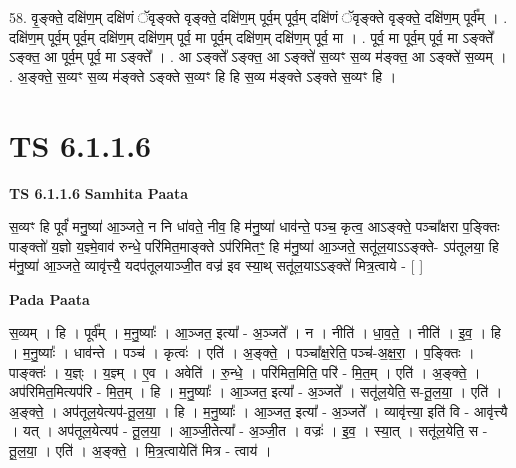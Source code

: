\documentclass[17pt]{extarticle}
\begin{document}
58. वृ॒ङ्क्ते॒ दक्षि॑ण॒म् दक्षि॑णं ॅवृङ्क्ते वृङ्क्ते॒ दक्षि॑ण॒म् पूर्व॒म् पूर्व॒म् दक्षि॑णं ॅवृङ्क्ते वृङ्क्ते॒ दक्षि॑ण॒म् पूर्व᳚म् । . दक्षि॑ण॒म् पूर्व॒म् पूर्व॒म् दक्षि॑ण॒म् दक्षि॑ण॒म् पूर्व॒ मा पूर्व॒म् दक्षि॑ण॒म् दक्षि॑ण॒म् पूर्व॒ मा । . पूर्व॒ मा पूर्व॒म् पूर्व॒ मा ऽङ्क्ते᳚ ऽङ्क्त॒ आ पूर्व॒म् पूर्व॒ मा ऽङ्क्ते᳚ । . आ ऽङ्क्ते᳚ ऽङ्क्त॒ आ ऽङ्क्ते॑ स॒व्यꣳ स॒व्य म॑ङ्क्त॒ आ ऽङ्क्ते॑ स॒व्यम् । . अ॒ङ्क्ते॒ स॒व्यꣳ स॒व्य म॑ङ्क्ते ऽङ्क्ते स॒व्यꣳ हि हि स॒व्य म॑ङ्क्ते ऽङ्क्ते स॒व्यꣳ हि । \newline
\pagebreak
{}

\section{ TS 6.1.1.6 }

\textbf{TS 6.1.1.6 } \newline
\textbf{Samhita Paata} \newline

स॒व्यꣳ हि पूर्वं॑ मनु॒ष्या॑ आ॒ञ्जते॒ न नि धा॑वते॒ नीव॒ हि म॑नु॒ष्या॑ धाव॑न्ते॒ पञ्च॒ कृत्व॒ आऽङ्क्ते॒ पञ्चा᳚क्षरा प॒ङ्क्तिः पाङ्क्तो॑ य॒ज्ञो य॒ज्ञ्मे॒वाव॑ रुन्धे॒ परि॑मित॒माङ्क्ते ऽप॑रिमितꣳ॒॒ हि म॑नु॒ष्या॑ आ॒ञ्जते॒ सतू॑ल॒याऽऽङ्क्ते- ऽप॑तूलया॒ हि म॑नु॒ष्या॑ आ॒ञ्जते॒ व्यावृ॑त्त्यै॒ यदप॑तूलयाञ्जी॒त वज्र॑ इव स्या॒थ् सतू॑ल॒याऽऽङ्क्ते॑ मित्र॒त्वाये - [  ] \newline

\textbf{Pada Paata} \newline

स॒व्यम् । हि । पूर्व᳚म् । म॒नु॒ष्याः᳚ । आ॒ञ्जत॒ इत्या᳚ - अ॒ञ्जते᳚ । न । नीति॑ । धा॒व॒ते॒ । नीति॑ । इ॒व॒ । हि । म॒नु॒ष्याः᳚ । धाव॑न्ते । पञ्च॑ । कृत्वः॑ । एति॑ । अ॒ङ्क्ते॒ । पञ्चा᳚क्ष॒रेति॒ पञ्च॑-अ॒क्ष॒रा॒ । प॒ङ्क्तिः । पाङ्क्तः॑ । य॒ज्ञ्ः । य॒ज्ञ्म् । ए॒व । अवेति॑ । रु॒न्धे॒ । परि॑मित॒मिति॒ परि॑ - मि॒त॒म् । एति॑ । अ॒ङ्क्ते॒ । अप॑रिमित॒मित्यप॑रि - मि॒त॒म् । हि । म॒नु॒ष्याः᳚ । आ॒ञ्जत॒ इत्या᳚ - अ॒ञ्जते᳚ । सतू॑ल॒येति॒ स-तू॒ल॒या॒ । एति॑ । अ॒ङ्क्ते॒ । अप॑तूल॒येत्यप॑-तू॒ल॒या॒ । हि । म॒नु॒ष्याः᳚ । आ॒ञ्जत॒ इत्या᳚ - अ॒ञ्जते᳚ । व्यावृ॑त्त्या॒ इति॑ वि - आवृ॑त्त्यै । यत् । अप॑तूल॒येत्यप॑ - तू॒ल॒या॒ । आ॒ञ्जी॒तेत्या᳚ - अ॒ञ्जी॒त । वज्रः॑ । इ॒व॒ । स्या॒त् । सतू॑ल॒येति॒ स - तू॒ल॒या॒ । एति॑ । अ॒ङ्क्ते॒ । मि॒त्र॒त्वायेति॑ मित्र - त्वाय॑ ।  \newline
\end{document}
